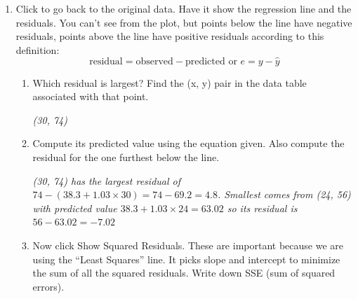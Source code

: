 \begin{enumerate}
\begin{enumerate}
\begin{key}
  {\it Close to 0 as well, I got a weird underflow problem, but it's
    about 0.0009}
\end{key}
\item Is correlation resistant to outliers?  Is slope? Explain.
  \begin{students}
 \vspace{1cm}      
\end{students}
\begin{key}
  {\it No.  One outlier completely changed correlation and slope.}
\end{key}
\end{enumerate}
\item Click  to go back to the original data. Have it
  show the regression line and the residuals.  You can't see from the
  plot, but points below the line have negative residuals, points
  above the line have positive residuals according to this definition:
$$ \mbox{residual} = \mbox{observed} - \mbox{predicted or } 
       e = y - \hat{y}$$
 \begin{enumerate}
   \item   Which residual is largest?
     Find the (x, y) pair  in the data table associated with that
     point.
\begin{students}
 \vspace{1cm}      
\end{students}

\begin{key}
  {\it (30, 74)}
\end{key}
\item Compute its predicted value using the equation given.  Also
     compute the residual for the one furthest below the line.
\begin{students}
 \vspace{1cm}      
\end{students}

\begin{key}
  {\it (30, 74) has the largest residual of $74 - (38.3 +1.03\times
    30) = 74 - 69.2 = 4.8$.   Smallest comes from (24, 56) with
    predicted value $38.3+1.03\times 24 = 63.02$ so its residual is
    $56 - 63.02 = -7.02$ }
\end{key}
   \item Now click {\sf Show Squared Residuals}.  These are important
     because we are using the ``Least Squares'' line. It picks slope
     and intercept to minimize the sum of all the squared residuals.
     Write down SSE (sum of squared errors). 
\begin{students}
 \vspace{1cm}      
\end{students}


\end{enumerate}
\end{enumerate}
